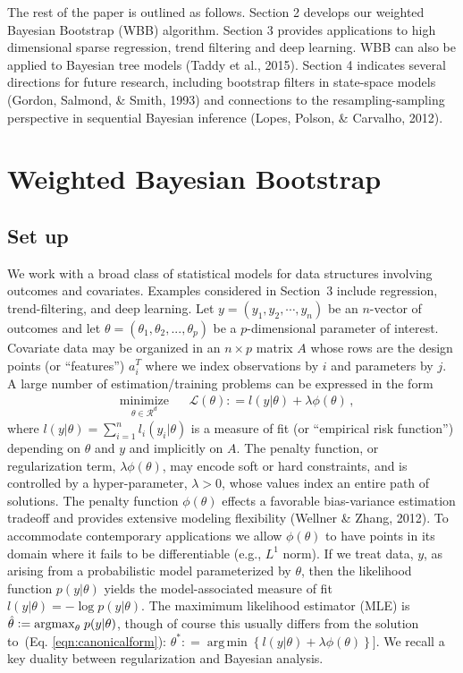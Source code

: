 \documentclass[12pt]{TD-CJS}
\newcommand{\R}{\mathcal{R}}
\newcommand{\defeq}{\mathrel{\mathop:}=}
\DeclareMathOperator*{\argmin}{arg\,min}
\begin{document}
The rest of the paper is outlined as follows. Section 2 develops our weighted Bayesian Bootstrap (WBB) algorithm. Section 3 provides applications to high dimensional sparse regression, trend filtering and deep learning. WBB can also be applied to Bayesian tree models (Taddy et al., 2015).  Section 4 indicates several directions for future research, 
including bootstrap filters in state-space models (Gordon, Salmond, \& Smith,  1993)  and connections to the resampling-sampling
perspective in sequential Bayesian inference (Lopes,  Polson,  \& Carvalho, 2012).

\section{Weighted Bayesian Bootstrap}
\subsection{Set up}
We work with a broad class of statistical models for data structures involving outcomes and covariates.
Examples considered in Section~3  include  regression, trend-filtering, and deep learning.
Let  $y=(y_1, y_2, \cdots, y_n)$ be an $n$-vector of outcomes and let $\theta = (\theta_1, \theta_2, ..., \theta_p)$ be a $p$-dimensional parameter of interest. 
Covariate data may be organized in an 
$n \times p$ matrix $A$ whose rows are the design points (or ``features'') $a_i^T$
where we index  observations by $i$ and parameters by $j$.  
A large number of estimation/training  problems can be expressed in the form
\begin{equation}
\label{eqn:canonicalform}
\begin{aligned}
& \underset{\theta \in \R^d}{\text{minimize}}
& &  \mathcal{L}(\theta) \defeq l(y| \theta) + \lambda\phi(\theta) \, ,
\end{aligned}
\end{equation}
where $l(y| \theta) = \sum_{i=1}^n l_i( y_i | \theta )$ is a measure of fit (or ``empirical risk function'') depending on $\theta$ and $y$ and implicitly on $A$.
The penalty function, or regularization term, $\lambda\phi(\theta) $,   
may encode soft or hard constraints, and is controlled by 
a hyper-parameter, $\lambda>0$, whose values index an entire path of solutions. 
The penalty function $\phi(\theta)$ effects a favorable bias-variance 
estimation tradeoff and provides extensive modeling flexibility (Wellner \& Zhang, 2012).   
To accommodate contemporary applications we  allow $\phi(\theta)$ to have points in its domain where it fails to be differentiable (e.g., $L^1$ norm).  
If we treat data, $y$, as arising from a probabilistic 
model parameterized by $\theta$, then the likelihood function $p(y|\theta)$ yields 
the model-associated measure of fit $l(y| \theta) = -\log p(y|\theta)$.
The maximimum likelihood estimator (MLE) is  $ \hat{\theta} \defeq {\rm arg max}_\theta\; p(y |\theta) $, though
of course this usually differs from the solution to~(Eq. \ref{eqn:canonicalform}): $\theta^* \defeq \argmin \left\{ l(y|\theta) + \lambda \phi(\theta)
 \right\}]$.  We recall a key duality between regularization and Bayesian analysis.
\end{document}
